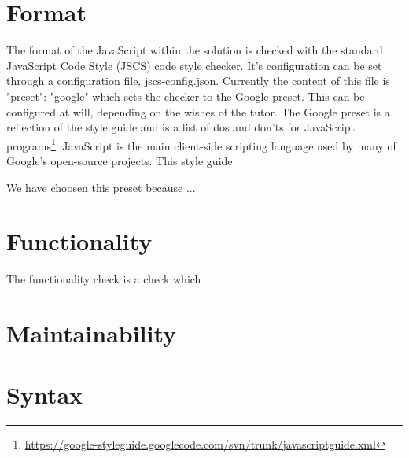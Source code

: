 % 


\section{Format}

The format of the JavaScript within the solution is checked with the standard
JavaScript Code Style (JSCS) code style checker.
It's configuration can be set through a configuration file, jscs-config.json.
Currently the content of this file is {"preset": "google"} which sets the checker
to the Google preset.
This can be configured at will, depending on the wishes of the tutor.
The Google preset is a reflection of the style guide and is a list of dos and
don'ts for JavaScript
programs\footnote{\url{https://google-styleguide.googlecode.com/svn/trunk/javascriptguide.xml}}.
JavaScript is the main client-side scripting language used by many of Google's
open-source projects. This style guide 

We have choosen this preset because ...



\section{Functionality}

The functionality check is a check which 


\section{Maintainability}


\section{Syntax}


